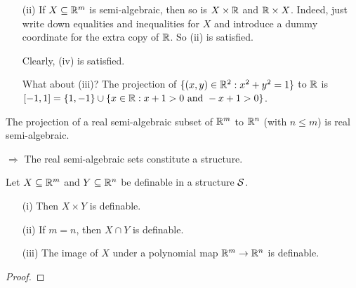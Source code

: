 \documentclass{beamer}
\begin{document}
\begin{frame}
  \begin{example}[Continued]
    \begin{enumerate}
    \item [(ii)]
      If $X\subseteq {\mathbb{R}}^m$ is semi-algebraic, then so is $X\times {\mathbb{R}}$
      and ${\mathbb{R}}\times X$. Indeed, just write down equalities and inequalities
      for $X$ and introduce a dummy coordinate for the extra copy of ${\mathbb{R}}$.
      So (ii) is satisfied.

      Clearly, (iv) is satisfied.
      
      What about (iii)? The projection of $\{(x,y) \in{\mathbb{R}}^2 :
      x^2+y^2=1\}$ to ${\mathbb{R}}$ is $[-1,1] = \{1,-1\}\cup
      \{x\in {\mathbb{R}} : x+1>0\text{ and }-x+1>0\}$.
    \end{enumerate}
  \end{example}
  
  \begin{theorem}
    The projection of a real semi-algebraic subset of ${\mathbb{R}}^m$ to
    ${\mathbb{R}}^n$ (with $n\le m$) is real semi-algebraic. 
  \end{theorem}

  $\Longrightarrow$ The  real semi-algebraic sets constitute a structure.
\end{frame}

\begin{frame}
  \begin{lemma}
    Let $X\subseteq{\mathbb{R}}^m$ and $Y\subseteq{\mathbb{R}}^n$ be definable in a structure  ${\mathcal S}$.
    \begin{enumerate}   
    \item [(i)] Then $X\times Y$ is definable.
    \item[(ii)] If $m=n$, then $X\cap Y$ is definable.
    \item[(iii)] The image of $X$ under a polynomial map
      ${\mathbb{R}}^m\rightarrow {\mathbb{R}}^n$ is definable.
    \end{enumerate}
  \end{lemma}
  \begin{proof}
    \vspace{4cm}
  \end{proof}
\end{frame}
\end{document}
